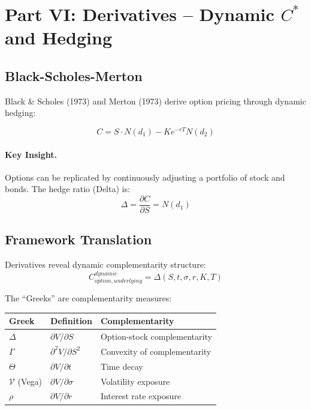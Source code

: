 \section{Part VI: Derivatives -- Dynamic $C^*$ and Hedging}
\label{sec:Y-derivatives}

\subsection{Black-Scholes-Merton}

Black \& Scholes (1973) and Merton (1973) derive option pricing through
dynamic hedging:

\begin{equation}
\boxed{
C = S \cdot N(d_1) - K e^{-rT} N(d_2)
}
\label{eq:bsm}
\end{equation}

\paragraph{Key Insight.}
Options can be replicated by continuously adjusting a portfolio of stock and
bonds. The hedge ratio (Delta) is:
\begin{equation}
\Delta = \frac{\partial C}{\partial S} = N(d_1)
\end{equation}

\subsection{Framework Translation}

Derivatives reveal dynamic complementarity structure:
\begin{equation}
C_{option, underlying}^{dynamic} = \Delta(S, t, \sigma, r, K, T)
\end{equation}

The ``Greeks'' are complementarity measures:
\begin{center}
\renewcommand{\arraystretch}{1.3}
\begin{tabular}{|l|l|l|}
\hline
\textbf{Greek} & \textbf{Definition} & \textbf{Complementarity} \\
\hline
$\Delta$ & $\partial V / \partial S$ & Option-stock complementarity \\
$\Gamma$ & $\partial^2 V / \partial S^2$ & Convexity of complementarity \\
$\Theta$ & $\partial V / \partial t$ & Time decay \\
$\mathcal{V}$ (Vega) & $\partial V / \partial \sigma$ & Volatility exposure \\
$\rho$ & $\partial V / \partial r$ & Interest rate exposure \\
\hline
\end{tabular}
\end{center}

